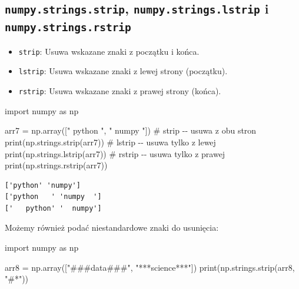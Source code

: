 \documentclass[
  polish,
  letterpaper,
  DIV=11,
  numbers=noendperiod]{scrreprt}
\newenvironment{Shaded}{\begin{snugshade}}{\end{snugshade}}
\newcommand{\BuiltInTok}[1]{\textcolor[rgb]{0.00,0.23,0.31}{#1}}
\newcommand{\CommentTok}[1]{\textcolor[rgb]{0.37,0.37,0.37}{#1}}
\newcommand{\ImportTok}[1]{\textcolor[rgb]{0.00,0.46,0.62}{#1}}
\newcommand{\NormalTok}[1]{\textcolor[rgb]{0.00,0.23,0.31}{#1}}
\newcommand{\OperatorTok}[1]{\textcolor[rgb]{0.37,0.37,0.37}{#1}}
\newcommand{\StringTok}[1]{\textcolor[rgb]{0.13,0.47,0.30}{#1}}
\providecommand{\tightlist}{%
  \setlength{\itemsep}{0pt}\setlength{\parskip}{0pt}}
\begin{document}
\subsection{\texorpdfstring{\texttt{numpy.strings.strip},
\texttt{numpy.strings.lstrip} i
\texttt{numpy.strings.rstrip}}{numpy.strings.strip, numpy.strings.lstrip i numpy.strings.rstrip}}\label{numpy.strings.strip-numpy.strings.lstrip-i-numpy.strings.rstrip}

\begin{itemize}
\tightlist
\item
  \texttt{strip}: Usuwa wskazane znaki z początku i końca.
\item
  \texttt{lstrip}: Usuwa wskazane znaki z lewej strony (początku).
\item
  \texttt{rstrip}: Usuwa wskazane znaki z prawej strony (końca).
\end{itemize}

\begin{Shaded}
\begin{Highlighting}[]
\ImportTok{import}\NormalTok{ numpy }\ImportTok{as}\NormalTok{ np}

\NormalTok{arr7 }\OperatorTok{=}\NormalTok{ np.array([}\StringTok{"   python   "}\NormalTok{, }\StringTok{"  numpy  "}\NormalTok{])}
\CommentTok{\# strip {-}{-} usuwa z obu stron}
\BuiltInTok{print}\NormalTok{(np.strings.strip(arr7))}
\CommentTok{\# lstrip {-}{-} usuwa tylko z lewej}
\BuiltInTok{print}\NormalTok{(np.strings.lstrip(arr7))}
\CommentTok{\# rstrip {-}{-} usuwa tylko z prawej}
\BuiltInTok{print}\NormalTok{(np.strings.rstrip(arr7))}
\end{Highlighting}
\end{Shaded}

\begin{verbatim}
['python' 'numpy']
['python   ' 'numpy  ']
['   python' '  numpy']
\end{verbatim}

Możemy również podać niestandardowe znaki do usunięcia:

\begin{Shaded}
\begin{Highlighting}[]
\ImportTok{import}\NormalTok{ numpy }\ImportTok{as}\NormalTok{ np}

\NormalTok{arr8 }\OperatorTok{=}\NormalTok{ np.array([}\StringTok{"\#\#\#data\#\#\#"}\NormalTok{, }\StringTok{"***science***"}\NormalTok{])}
\BuiltInTok{print}\NormalTok{(np.strings.strip(arr8, }\StringTok{"\#*"}\NormalTok{))}
\end{Highlighting}
\end{Shaded}
\end{document}
